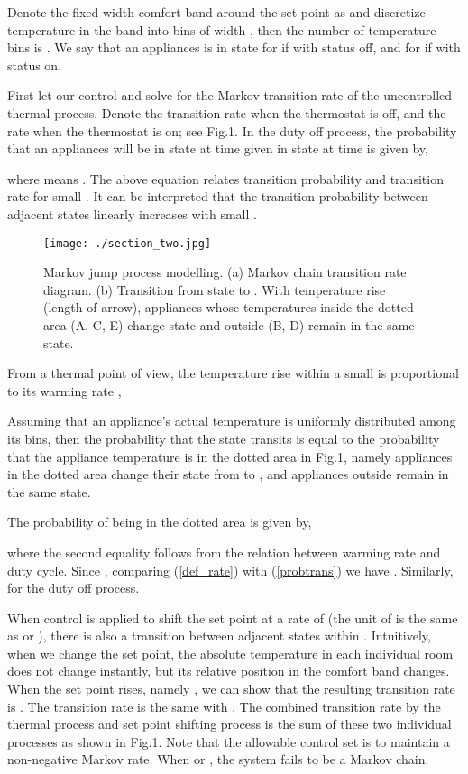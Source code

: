 \documentclass[journal]{IEEEtran}
\begin{document}
Denote the fixed width comfort band around the set point as  and discretize temperature in the band into bins of width , then the number of temperature bins is . We say that an appliances is in state  for  if  with status off, and  for  if  with status on.

First let our control  and solve for the Markov transition rate of the uncontrolled thermal process. Denote  the transition rate when the thermostat is off, and  the rate when the thermostat is on; see Fig.1. In the duty off process, the probability that an appliances will be in state  at time  given in state  at time  is given by,

where  means . The above equation relates transition probability and transition rate for small . It can be interpreted that the transition probability between adjacent states linearly increases with small . 

\begin{figure}[htb]
\centering
\label{trans1}
\texttt{[image: ./section\_two.jpg]}
\caption{Markov jump process modelling. (a) Markov chain transition rate diagram. (b) Transition from state  to . With temperature rise  (length of arrow), appliances whose temperatures inside the dotted area (A, C, E) change state and outside (B, D) remain in the same state.}
\end{figure}

From a thermal point of view, the temperature rise  within a small  is proportional to its warming rate ,

Assuming that an appliance's actual temperature is uniformly distributed among its bins, then the probability that the state transits is equal to the probability that the appliance temperature is in the dotted area in Fig.1, namely appliances in the dotted area change their state from  to , and appliances outside remain in the same state.

The probability of being in the dotted area is given by,

where the second equality follows from the relation between warming rate and duty cycle. Since , comparing (\ref{def_rate}) with (\ref{probtrans}) we have . Similarly,  for the duty off process. 

When control is applied to shift the set point at a rate of  (the unit of  is the same as  or ), there is also a transition between adjacent states within . Intuitively, when we change the set point, the absolute temperature in each individual room does not change instantly, but its relative position in the comfort band changes. When the set point rises, namely , we can show that the resulting transition rate is . The transition rate is the same with . The combined transition rate by the thermal process and set point shifting process is the sum of these two individual processes as shown in Fig.1. Note that the allowable control set is  to maintain a non-negative Markov rate. When  or , the system fails to be a Markov chain. 
\end{document}

